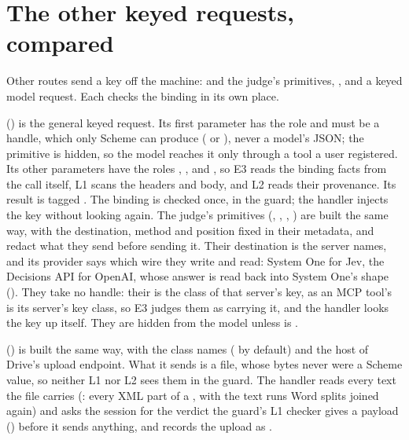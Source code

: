 \section{The other keyed requests, compared}

Other routes send a key off the machine:  and the
judge's primitives, , and a keyed model request.
Each checks the binding in its own place.

 () is the general keyed
request. Its first parameter has the role  and must be a
handle, which only Scheme can produce ( or
), never a model's JSON; the primitive is
hidden, so the model reaches it only through a tool a user registered. Its other parameters have the roles ,
,  and , so E3 reads the binding
facts from the call itself, L1 scans the headers and body, and L2 reads
their provenance. Its result is tagged . The binding is
checked once, in the guard; the handler injects the key without looking
again. The judge's primitives (, ,
, ) are built the same way,
with the destination, method and position fixed in their metadata, and
redact what they send before sending it. Their destination is the server
\code{[judge]} names, and its provider says which wire they write and
read: System One for Jev, the Decisions API for OpenAI, whose answer is
read back into System One's shape (). They take no handle: their
 is the class of that server's key, as an MCP tool's is
its server's key class, so E3 judges them as carrying it, and the handler
looks the key up itself. They are hidden from the model unless
 is .

 () is built the same
way, with the class  names (
by default) and the host of Drive's upload endpoint.
What it sends is a file, whose bytes never were a Scheme value, so neither
L1 nor L2 sees them in the guard. The handler reads every text the file
carries (: every XML part of a , with the
text runs Word splits joined again) and asks the session for the verdict
the guard's L1 checker gives a payload () before
it sends anything, and records the upload as .

